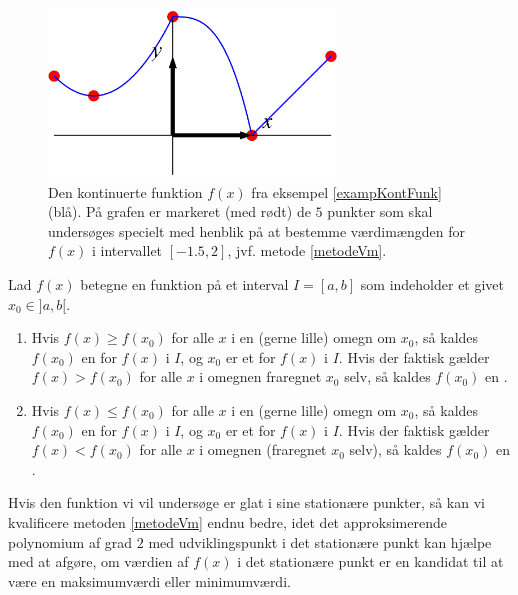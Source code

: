 \begin{figure}[ht]
\centerline{ \includegraphics[height=45mm]{plotVm.pdf}}
\begin{center}
\caption{Den kontinuerte funktion $f(x)$ fra eksempel \ref{exampKontFunk} (blå). På grafen er markeret (med rødt) de $5$ punkter som skal undersøges specielt med henblik på at bestemme værdimængden for $f(x)$ i intervallet $[-1.5, 2]$, jvf. metode \ref{metodeVm}. } \label{figVm}
\end{center}
\end{figure}

\begin{definition}
Lad $f(x)$ betegne en funktion på et interval $I = [a, b]$ som indeholder et givet $x_{0} \in ]a, b[$.
\begin{enumerate}
\item  Hvis $f(x) \geq f(x_{0})$ for alle $x$ i en (gerne lille) omegn om $x_{0}$, så kaldes $f(x_{0})$ en   for $f(x)$ i $I$, og $x_{0}$ er et  for $f(x)$ i $I$. Hvis der faktisk gælder $f(x) > f(x_{0})$ for alle $x$ i omegnen fraregnet $x_{0}$ selv, så kaldes $f(x_{0})$ en .
\item Hvis $f(x) \leq f(x_{0})$ for alle $x$ i en (gerne lille) omegn om $x_{0}$, så kaldes $f(x_{0})$ en   for $f(x)$ i $I$, og $x_{0}$ er et  for $f(x)$ i $I$. Hvis der faktisk gælder $f(x) < f(x_{0})$ for alle $x$ i omegnen (fraregnet $x_{0}$ selv), så kaldes $f(x_{0})$ en .
\end{enumerate}
\end{definition}

Hvis den funktion vi vil undersøge er glat i sine stationære punkter, så kan vi kvalificere metoden \ref{metodeVm} endnu bedre, idet det approksimerende polynomium af grad $2$ med udviklingspunkt i det stationære punkt kan hjælpe med at afgøre, om værdien af $f(x)$ i det stationære punkt er en kandidat til at være en maksimumværdi eller minimumværdi.

